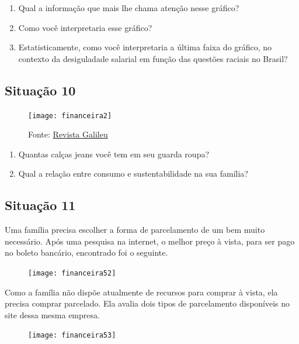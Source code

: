 \begin{enumerate}
  \item Qual a informação que mais lhe chama atenção nesse gráfico?
  \item Como você interpretaria esse gráfico?
  \item Estatisticamente, como você interpretaria a última faixa do gráfico, no contexto da desiguladade salarial em função das questões raciais no Brasil?
\end{enumerate}

\subsection{Situação 10}
\begin{figure}[H]
\centering

\texttt{[image: financeira2]}
\caption{Fonte: \href{https://revistagalileu.globo.com/Ciencia/Meio-Ambiente/noticia/2019/08/sua-calca-jeans-gastou-mais-de-5-mil-litros-de-agua-para-ser-produzida-entenda.html}{Revista Galileu}}

\end{figure}
\begin{enumerate}
  \item Quantas calças jeans você tem em seu guarda roupa?
  \item Qual a relação entre consumo e sustentabilidade na sua família?
\end{enumerate}

\subsection{Situação 11}
Uma família precisa escolher a forma de parcelamento de um bem muito necessário. Após uma pesquisa na internet, o melhor preço à vista, para ser pago no boleto bancário, encontrado foi o seguinte.

\begin{figure}[H]
\centering

\texttt{[image: financeira52]}
\end{figure}

Como a família não dispõe atualmente de recursos para comprar à vista, ela precisa comprar parcelado. Ela avalia dois tipos de parcelamento disponíveis no site dessa mesma empresa.

\begin{figure}[H]
\centering

\texttt{[image: financeira53]}
\end{figure}

